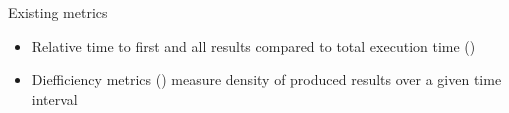 
\begin{frame}{Existing metrics}
    \begin{itemize}
        \item Relative time to first and all results compared to total execution time (\textcite{hartig2016walking})
        \item Diefficiency metrics (\textcite{acosta2017diefficiency}) measure density of produced results over a given time interval 
    \end{itemize}
\end{frame}
